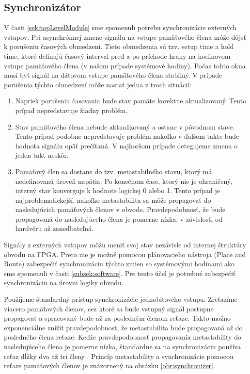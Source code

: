 \subsection{Synchronizátor} \label{subsek:synchronizer}
V časti \ref{sek:topLevelModule} sme spomenuli potrebu synchronizácie externých vstupov. Pri asynchrónnej zmene signálu na vstupe pamäťového člena môže dôjsť k porušeniu časových obmedzení. Tieto obmedzenia sú tzv. setup time a hold time, ktoré definujú časový interval pred a po príchode hrany na hodinovom vstupe pamäťového člena (v našom prípade systémové hodiny). Počas tohto okna musí byť signál na dátovom vstupe pamäťového člena stabilný. V prípade porušenia týchto obmedzení môže nastať jedna z troch situácií:
\begin{enumerate}
    \item Napriek porušeniu časovania bude stav pamäte korektne aktualizovaný. Tento prípad nepredstavuje žiadny problém.
    \item Stav pamäťového člena nebude aktualizovaný a ostane v pôvodnom stave. Tento prípad podobne nepredstavuje problém nakoľko v ďalšom takte bude hodnota signálu opäť prečítaná. V najhoršom prípade detegujeme zmenu o jeden takt neskôr.
    \item Pamäťový člen sa dostane do tzv. metastabilného stavu, ktorý má nedefinovanú úroveň napätia. Po konečnom čase, ktorý nie je ohraničený, interný stav konverguje k hodnote logickej 0 alebo 1. Tento prípad je najproblematickejší, nakoľko metastabilita sa môže propagovať do nasledujúcich pamäťových členov v obvode. Pravdepodobnosť, že bude propagovaná do nasledujúceho člena je pomerne nízka, v závislosti od hardvéru až zanedbateľná.
\end{enumerate}
Signály z externých vstupov môžu meniť svoj stav nezávisle od internej štruktúry obvodu na FPGA. Preto nie je možné pomocou plánovacieho nástroja (Place and Route) zabezpečiť synchronizáciu týchto zmien so systémovými hodinami ako sme spomenuli v časti \ref{subsek:software}. Pre tento účel je potrebné zabezpečiť synchronizáciu na úrovni logiky obvodu.

Použijeme štandardný prístup synchronizácie jednobitového vstupu. Zreťazíme viacero pamäťových členov, cez ktoré sa bude vstupný signál postupne propagovať a spracovaný bude až za posledným členom reťaze. Takto možno exponenciálne znížiť pravdepodobnosť, že metastabilita bude propagovaná až do posledného člena reťaze. Keďže pravdepodobnosť propagovania metastability do nasledujúceho člena je pomerne nízka, štandardne sa na synchronizáciu používa reťaz dĺžky dva až tri členy \cite{metastability}. Princíp metastability a synchronizácie pomocou reťaze pamäťových členov je znázornený na obrázku \ref{obr:synchronizer}.

